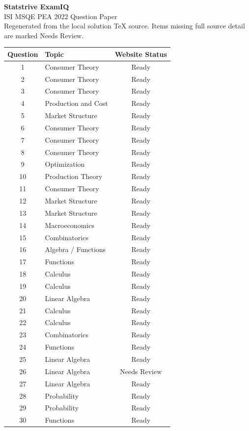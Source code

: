 \documentclass[11pt]{article}
\begin{document}
\begin{center}
{\Huge \textbf{Statstrive ExamIQ}}\\[6pt]
{\Large ISI MSQE PEA 2022 Question Paper}\\[4pt]
{\small Regenerated from the local solution TeX source. Items missing full source detail are marked Needs Review.}
\end{center}

\vspace{0.5cm}
\begin{longtable}{c l c}
\toprule
Question & Topic & Website Status \\
\midrule
\endhead
1 & Consumer Theory & Ready \\
2 & Consumer Theory & Ready \\
3 & Consumer Theory & Ready \\
4 & Production and Cost & Ready \\
5 & Market Structure & Ready \\
6 & Consumer Theory & Ready \\
7 & Consumer Theory & Ready \\
8 & Consumer Theory & Ready \\
9 & Optimization & Ready \\
10 & Production Theory & Ready \\
11 & Consumer Theory & Ready \\
12 & Market Structure & Ready \\
13 & Market Structure & Ready \\
14 & Macroeconomics & Ready \\
15 & Combinatorics & Ready \\
16 & Algebra / Functions & Ready \\
17 & Functions & Ready \\
18 & Calculus & Ready \\
19 & Calculus & Ready \\
20 & Linear Algebra & Ready \\
21 & Calculus & Ready \\
22 & Calculus & Ready \\
23 & Combinatorics & Ready \\
24 & Functions & Ready \\
25 & Linear Algebra & Ready \\
26 & Linear Algebra & Needs Review \\
27 & Linear Algebra & Ready \\
28 & Probability & Ready \\
29 & Probability & Ready \\
30 & Functions & Ready \\
\bottomrule
\end{longtable}
\end{document}
